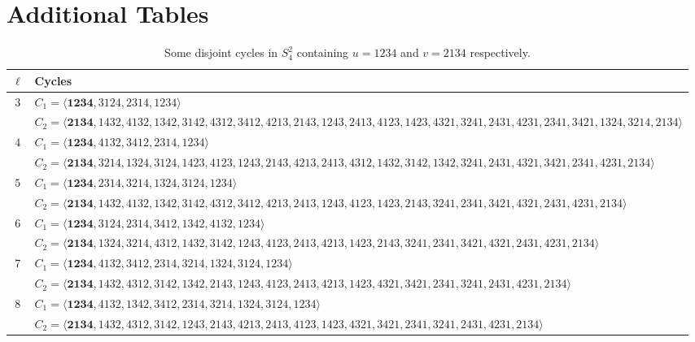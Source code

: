 \documentclass[12pt,a4paper]{amsart}
\newcounter{foo}[subsection]
\theoremstyle{definition}
\begin{document}
\appendix
\begin{table}[H]
\centering
\begin{adjustbox}{angle=90,max height=\textheight} %
\begin{minipage}{\textheight} %
\centering
\section{Additional Tables}
\caption{Some disjoint cycles in $S_4^2$ containing $u=1234$ and $v=2134$ respectively.}
\label{3-11}

\footnotesize
\setlength{\tabcolsep}{2pt}
\renewcommand{\arraystretch}{0.9}

\begin{tabular}{@{}c l@{}}
\toprule
$\ell$ & Cycles \\
\midrule

$3$ &
$C_1=\langle\mathbf{1234},3124,2314,1234\rangle$\\
&
$C_2=\langle\mathbf{2134},1432,4132,1342,3142,4312,3412,4213,2143,1243,2413,4123,1423,4321,3241,2431,4231,2341,3421,1324,3214,2134\rangle$
\\
\midrule

$4$ &
$C_1=\langle\mathbf{1234},4132,3412,2314,1234\rangle$\\
&
$C_2=\langle\mathbf{2134},3214,1324,3124,1423,4123,1243,2143,4213,2413,4312,1432,3142,1342,3241,2431,4321,3421,2341,4231,2134\rangle$
\\
\midrule

$5$ &
$C_1=\langle\mathbf{1234},2314,3214,1324,3124,1234\rangle$\\
&
$C_2=\langle\mathbf{2134},1432,4132,1342,3142,4312,3412,4213,2413,1243,4123,1423,2143,3241,2341,3421,4321,2431,4231,2134\rangle$
\\
\midrule

$6$ &
$C_1=\langle\mathbf{1234},3124,2314,3412,1342,4132,1234\rangle$\\
&
$C_2=\langle\mathbf{2134},1324,3214,4312,1432,3142,1243,4123,2413,4213,1423,2143,3241,2341,3421,4321,2431,4231,2134\rangle$
\\\midrule

$7$ &
$C_1=\langle\mathbf{1234},4132,3412,2314,3214,1324,3124,1234\rangle$\\
&
$C_2=\langle\mathbf{2134},1432,4312,3142,1342,2143,1243,4123,2413,4213,1423,4321,3421,2341,3241,2431,4231,2134\rangle$
\\\midrule

$8$ &
$C_1=\langle\mathbf{1234},4132,1342,3412,2314,3214,1324,3124,1234\rangle$\\
&
$C_2=\langle\mathbf{2134},1432,4312,3142,1243,2143,4213,2413,4123,1423,4321,3421,2341,3241,2431,4231,2134\rangle$
\\\midrule


\end{tabular}
\end{minipage}
\end{adjustbox}
\end{table}
\end{document}
